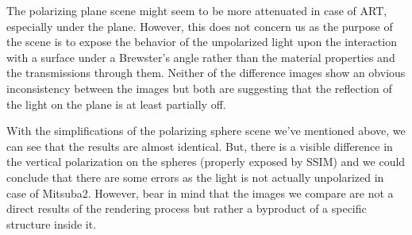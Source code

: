 The polarizing plane scene might seem to be more attenuated in case of ART, especially under the plane. However, this does not concern us as the purpose of the scene is to expose the behavior of the unpolarized light upon the interaction with a surface under a Brewster's angle rather than the material properties and the transmissions through them. Neither of the difference images show an obvious inconsistency between the images but both are suggesting that the reflection of the light on the plane is at least partially off.

With the simplifications of the polarizing sphere scene we've mentioned above, we can see that the results are almost identical. But, there is  a visible difference in the vertical polarization on the spheres (properly exposed by SSIM) and we could conclude that there are some errors as the light is not actually unpolarized in case of Mitsuba2. However, bear in mind that the images we compare are not a direct results of the rendering process but rather a byproduct of a specific structure inside it.